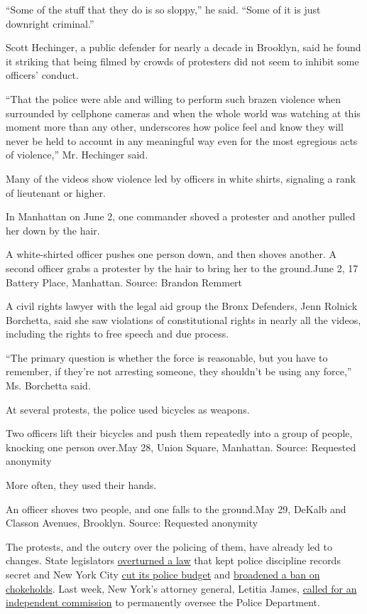 ``Some of the stuff that they do is so sloppy,'' he said. ``Some of it
is just downright criminal.''

Scott Hechinger, a public defender for nearly a decade in Brooklyn, said
he found it striking that being filmed by crowds of protesters did not
seem to inhibit some officers' conduct.

``That the police were able and willing to perform such brazen violence
when surrounded by cellphone cameras and when the whole world was
watching at this moment more than any other, underscores how police feel
and know they will never be held to account in any meaningful way even
for the most egregious acts of violence,'' Mr. Hechinger said.

Many of the videos show violence led by officers in white shirts,
signaling a rank of lieutenant or higher.

In Manhattan on June 2, one commander shoved a protester and another
pulled her down by the hair.

A white-shirted officer pushes one person down, and then shoves another.
A second officer grabs a protester by the hair to bring her to the
ground.June 2, 17 Battery Place, Manhattan. Source: Brandon Remmert

A civil rights lawyer with the legal aid group the Bronx Defenders, Jenn
Rolnick Borchetta, said she saw violations of constitutional rights in
nearly all the videos, including the rights to free speech and due
process.

``The primary question is whether the force is reasonable, but you have
to remember, if they're not arresting someone, they shouldn't be using
any force,'' Ms. Borchetta said.

At several protests, the police used bicycles as weapons.

Two officers lift their bicycles and push them repeatedly into a group
of people, knocking one person over.May 28, Union Square, Manhattan.
Source: Requested anonymity

More often, they used their hands.

An officer shoves two people, and one falls to the ground.May 29, DeKalb
and Classon Avenues, Brooklyn. Source: Requested anonymity

The protests, and the outcry over the policing of them, have already led
to changes. State legislators
\href{https://www.nytimes3xbfgragh.onion/2020/06/12/nyregion/50a-repeal-police-floyd.html}{overturned
a law} that kept police discipline records secret and New York City
\href{https://www.nytimes3xbfgragh.onion/2020/06/30/nyregion/nypd-budget.html}{cut
its police budget} and
\href{https://www.gothamgazette.com/city/9555-police-commissioner-shea-repeatedly-contradicts-mayor-de-blasio-nypd}{broadened
a ban on chokeholds}. Last week, New York's attorney general, Letitia
James,
\href{https://www.nytimes3xbfgragh.onion/2020/07/08/nyregion/letitia-james-nypd-reforms.html}{called
for an independent commission} to permanently oversee the Police
Department.

